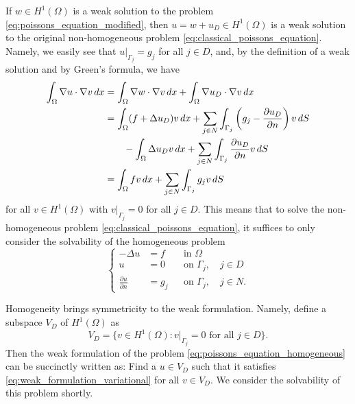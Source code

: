 \documentclass[english, 12pt, a4paper, sci, utf8, a-2b, online]{aaltothesis}
\theoremstyle{definition}
\theoremstyle{plain}
\newcommand*\diff{\mathop{}\!d}
\numberwithin{equation}{section}
\begin{document}
If $w \in H^1(\Omega)$ is a weak solution to the problem
\eqref{eq:poissons_equation_modified}, then $u = w + u_D \in H^1(\Omega)$
is a weak solution to the original non-homogeneous problem
\eqref{eq:classical_poissons_equation}. Namely, we easily see that
$u|_{\Gamma_j} = g_j$ for all $j \in D$, and, by the definition of
a weak solution and by Green's formula, we have
\begin{align*}
    \int_{\Omega} \nabla u \cdot \nabla v \diff x
    &= \int_{\Omega} \nabla w \cdot \nabla v \diff x
        + \int_{\Omega} \nabla u_D \cdot \nabla v \diff x \\
    &= \int_{\Omega} (f + \Delta u_D) v \diff x
        + \sum_{j \in N} \int_{\Gamma_j}
            \left( g_j - \frac{\partial u_D}{\partial n} \right) v \diff S \\
    &\hspace{7mm} - \int_{\Omega} \Delta u_D v \diff x
                    + \sum_{j \in N} \int_{\Gamma_j}
                        \frac{\partial u_D}{\partial n} v \diff S \\
    &= \int_{\Omega} fv \diff x + \sum_{j \in N} \int_{\Gamma_j} g_j v \diff S
\end{align*}
for all $v \in H^1(\Omega)$ with $v|_{\Gamma_j} = 0$ for all $j \in D$.
This means that to solve the non-homogeneous problem 
\eqref{eq:classical_poissons_equation}, it suffices to only consider the solvability
of the homogeneous problem
\begin{equation}
    \label{eq:poissons_equation_homogeneous}
    \left\{
        \begin{aligned}
            -\Delta u &= f && \text{in } \Omega \\
            u &= 0 && \text{on } \Gamma_j, \quad j \in D \\
            \frac{\partial u}{\partial n} &= g_j && \text{on } \Gamma_j,
            \quad j \in N.
        \end{aligned}
    \right.
\end{equation}

Homogeneity brings symmetricity to the weak formulation.
Namely, define a subspace $V_D$ of $H^1(\Omega)$ as
\begin{equation*}
    V_D = \{ v \in H^1(\Omega) :
        v|_{\Gamma_j} = 0 \text{ for all } j \in D \}.
\end{equation*}
Then the weak formulation of the problem \eqref{eq:poissons_equation_homogeneous}
can be succinctly written as: Find a $u \in V_D$ such that it satisfies
\eqref{eq:weak_formulation_variational} for all $v \in V_D$.
We consider the solvability of this problem shortly.
\end{document}
